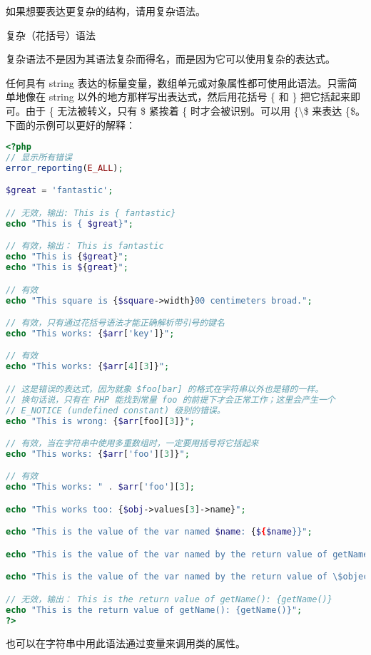\begin{compactitem}
如果想要表达更复杂的结构，请用复杂语法。

\item 复杂（花括号）语法

复杂语法不是因为其语法复杂而得名，而是因为它可以使用复杂的表达式。

任何具有 string 表达的标量变量，数组单元或对象属性都可使用此语法。只需简单地像在 string 以外的地方那样写出表达式，然后用花括号 \{ 和 \} 把它括起来即可。由于 \{ 无法被转义，只有 \$ 紧挨着 \{ 时才会被识别。可以用 \{\textbackslash \$ 来表达 \{\$。下面的示例可以更好的解释：

\begin{lstlisting}[language=PHP]
<?php
// 显示所有错误
error_reporting(E_ALL);

$great = 'fantastic';

// 无效，输出: This is { fantastic}
echo "This is { $great}";

// 有效，输出： This is fantastic
echo "This is {$great}";
echo "This is ${great}";

// 有效
echo "This square is {$square->width}00 centimeters broad."; 

// 有效，只有通过花括号语法才能正确解析带引号的键名
echo "This works: {$arr['key']}";

// 有效
echo "This works: {$arr[4][3]}";

// 这是错误的表达式，因为就象 $foo[bar] 的格式在字符串以外也是错的一样。
// 换句话说，只有在 PHP 能找到常量 foo 的前提下才会正常工作；这里会产生一个
// E_NOTICE (undefined constant) 级别的错误。
echo "This is wrong: {$arr[foo][3]}"; 

// 有效，当在字符串中使用多重数组时，一定要用括号将它括起来
echo "This works: {$arr['foo'][3]}";

// 有效
echo "This works: " . $arr['foo'][3];

echo "This works too: {$obj->values[3]->name}";

echo "This is the value of the var named $name: {${$name}}";

echo "This is the value of the var named by the return value of getName(): {${getName()}}";

echo "This is the value of the var named by the return value of \$object->getName(): {${$object->getName()}}";

// 无效，输出： This is the return value of getName(): {getName()}
echo "This is the return value of getName(): {getName()}";
?>
\end{lstlisting}

也可以在字符串中用此语法通过变量来调用类的属性。


\end{compactitem}
